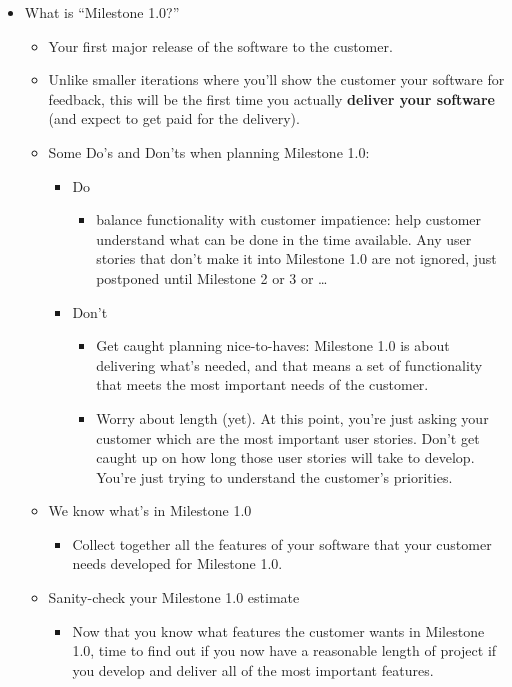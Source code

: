 \documentclass[letterpaper]{article}
\begin{document}
\begin{itemize}
    \item What is ``Milestone 1.0?''
    \begin{itemize}
        \item Your first major release of the software to the customer. 
        \item Unlike smaller iterations where you'll show the customer your software for feedback, this will be the first time you actually \textbf{deliver your software} (and expect to get paid for the delivery).
        \item Some Do's and Don'ts when planning Milestone 1.0: 
        \begin{itemize}
            \item Do 
            \begin{itemize}
                \item balance functionality with customer impatience: help customer understand what can be done in the time available. Any user stories that don't make it into Milestone 1.0 are not ignored, just postponed until Milestone 2 or 3 or \dots
            \end{itemize}
            \item Don't 
            \begin{itemize}
                \item Get caught planning nice-to-haves: Milestone 1.0 is about delivering what's needed, and that means a set of functionality that meets the most important needs of the customer. 
                \item Worry about length (yet). At this point, you're just asking your customer which are the most important user stories. Don't get caught up on how long those user stories will take to develop. You're just trying to understand the customer's priorities.
            \end{itemize}
        \end{itemize}


        \item We know what's in Milestone 1.0
        \begin{itemize}
            \item Collect together all the features of your software that your customer needs developed for Milestone 1.0.
        \end{itemize}

        \item Sanity-check your Milestone 1.0 estimate
        \begin{itemize}
            \item Now that you know what features the customer wants in Milestone 1.0, time to find out if you now have a reasonable length of project if you develop and deliver all of the most important features. 
        \end{itemize}


\end{itemize}
\end{itemize}
\end{document}

